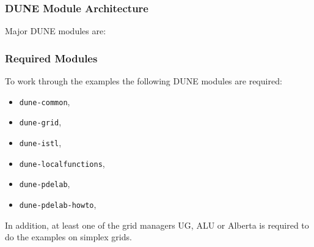 \begin{frame}
\frametitle<presentation>{DUNE Module Architecture}
Major DUNE modules are:
\begin{center}
\end{center}
\end{frame}

\begin{frame}
\frametitle<presentation>{Required Modules}
To work through the examples the following DUNE modules are required: 
\begin{itemize}
\item \lstinline{dune-common},
\item \lstinline{dune-grid},
\item \lstinline{dune-istl},
\item \lstinline{dune-localfunctions},
\item \lstinline{dune-pdelab},
\item \lstinline{dune-pdelab-howto},
\end{itemize}

In addition, at least one of the grid managers UG, ALU or Alberta is
required to do the examples on simplex grids. 
\end{frame}



